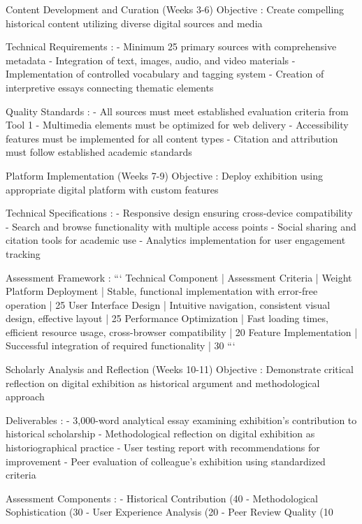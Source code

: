 \begin{appendices}
     Content Development and Curation (Weeks 3-6)
 Objective : Create compelling historical content utilizing diverse digital sources and media

 Technical Requirements :
- Minimum 25 primary sources with comprehensive metadata
- Integration of text, images, audio, and video materials
- Implementation of controlled vocabulary and tagging system
- Creation of interpretive essays connecting thematic elements

 Quality Standards :
- All sources must meet established evaluation criteria from Tool 1
- Multimedia elements must be optimized for web delivery
- Accessibility features must be implemented for all content types
- Citation and attribution must follow established academic standards

     Platform Implementation (Weeks 7-9)
 Objective : Deploy exhibition using appropriate digital platform with custom features

 Technical Specifications :
- Responsive design ensuring cross-device compatibility
- Search and browse functionality with multiple access points
- Social sharing and citation tools for academic use
- Analytics implementation for user engagement tracking

 Assessment Framework :
```
Technical Component | Assessment Criteria | Weight
Platform Deployment | Stable, functional implementation with error-free operation | 25%
User Interface Design | Intuitive navigation, consistent visual design, effective layout | 25%
Performance Optimization | Fast loading times, efficient resource usage, cross-browser compatibility | 20%
Feature Implementation | Successful integration of required functionality | 30%
```

     Scholarly Analysis and Reflection (Weeks 10-11)
 Objective : Demonstrate critical reflection on digital exhibition as historical argument and methodological approach

 Deliverables :
- 3,000-word analytical essay examining exhibition's contribution to historical scholarship
- Methodological reflection on digital exhibition as historiographical practice
- User testing report with recommendations for improvement
- Peer evaluation of colleague's exhibition using standardized criteria

 Assessment Components :
-  Historical Contribution  (40%
-  Methodological Sophistication  (30%
-  User Experience Analysis  (20%
-  Peer Review Quality  (10%


\end{appendices}
